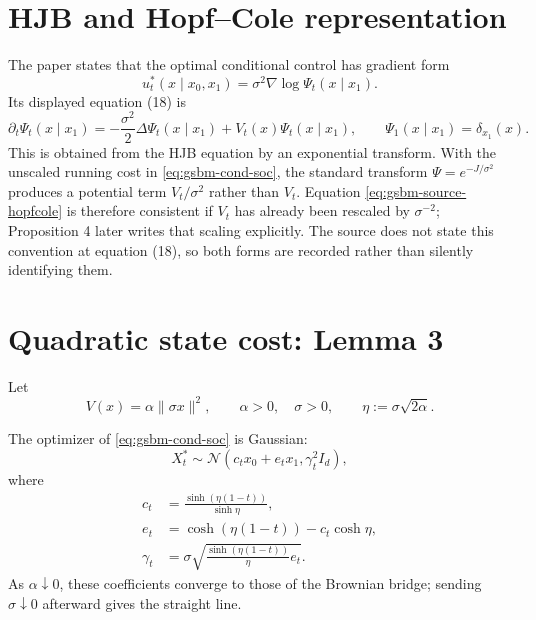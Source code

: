 \section{HJB and Hopf--Cole representation}
The paper states that the optimal conditional control has gradient form
\[
  u_t^*(x\mid x_0,x_1)=\sigma^2\nabla\log\Psi_t(x\mid x_1).
\]
Its displayed equation (18) is
\begin{equation}
  \partial_t\Psi_t(x\mid x_1)
  =-\frac{\sigma^2}{2}\Delta\Psi_t(x\mid x_1)
   +V_t(x)\Psi_t(x\mid x_1),
  \qquad
  \Psi_1(x\mid x_1)=\delta_{x_1}(x).
  \tag{18}\label{eq:gsbm-source-hopfcole}
\end{equation}
This is obtained from the HJB equation by an exponential transform.  With the
unscaled running cost in \eqref{eq:gsbm-cond-soc}, the standard transform
$\Psi=e^{-J/\sigma^2}$ produces a potential term $V_t/\sigma^2$ rather than
$V_t$.  Equation \eqref{eq:gsbm-source-hopfcole} is therefore consistent if
$V_t$ has already been rescaled by $\sigma^{-2}$; Proposition 4 later writes
that scaling explicitly.  The source does not state this convention at equation
(18), so both forms are recorded rather than silently identifying them.

\section{Quadratic state cost: Lemma 3}
Let
\[
  V(x)=\alpha\|\sigma x\|^2,
  \qquad
  \alpha>0,
  \quad \sigma>0,
  \qquad
  \eta:=\sigma\sqrt{2\alpha}.
\]

\begin{lemma}[Lemma 3]
The optimizer of \eqref{eq:gsbm-cond-soc} is Gaussian:
\[
  X_t^*\sim\mathcal N(c_t x_0+e_t x_1,\gamma_t^2 I_d),
\]
where
\begin{align}
  c_t&=\frac{\sinh(\eta(1-t))}{\sinh\eta},\label{eq:gsbm-ct}\\
  e_t&=\cosh(\eta(1-t))-c_t\cosh\eta,\label{eq:gsbm-et}\\
  \gamma_t&=\sigma
  \sqrt{\frac{\sinh(\eta(1-t))}{\eta}e_t}.
  \label{eq:gsbm-gammat}
\end{align}
As $\alpha\downarrow0$, these coefficients converge to those of the Brownian
bridge; sending $\sigma\downarrow0$ afterward gives the straight line.
\end{lemma}

